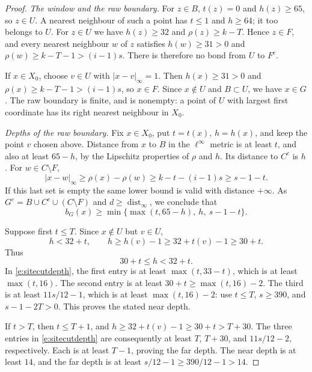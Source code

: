 \begin{proof}
\emph{The window and the raw boundary.}
For \(z\in B\), \(t(z)=0\) and \(h(z)\ge65\), so \(z\in U\).
A nearest neighbour of such a point has \(t\le1\) and
\(h\ge64\); it too belongs to \(U\).  For \(z\in U\) we
have \(h(z)\ge32\) and \(\rho(z)\ge k-T\).  Hence \(z\in F\),
and every nearest neighbour \(w\) of \(z\) satisfies
\(h(w)\ge31>0\) and \(\rho(w)\ge k-T-1>(i-1)s\).
There is therefore no bond from \(U\) to \(F^c\).

If \(x\in X_0\), choose \(v\in U\) with
\(|x-v|_\infty=1\).  Then
\(h(x)\ge31>0\) and \(\rho(x)\ge k-T-1>(i-1)s\),
so \(x\in F\).  Since \(x\notin U\) and \(B\subset U\),
we have \(x\in G\).  The raw boundary is finite, and is
nonempty: a point of \(U\) with largest first coordinate has
its right nearest neighbour in \(X_0\).

\emph{Depths of the raw boundary.}
Fix \(x\in X_0\), put \(t=t(x)\), \(h=h(x)\), and keep the
point \(v\) chosen above.  Distance from \(x\) to \(B\) in
the \(\ell^\infty\) metric is at least \(t\), and also at
least \(65-h\), by the Lipschitz properties of \(\rho\) and
\(h\).  Its distance to \(C^c\) is \(h\).  For
\(w\in C\setminus F\),
\[
 |x-w|_\infty\ge\rho(x)-\rho(w)
       \ge k-t-(i-1)s\ge s-1-t.
\]
If this last set is empty the same lower bound is valid with
distance \(+\infty\).  As \(G^c=B\cup C^c\cup(C\setminus F)\)
and \(d\ge\operatorname{dist}_\infty\), we conclude that
\begin{equation}\label{e:sitecutdepth}
 b_G(x)\ge
    \min\{\max(t,65-h),\ h,\ s-1-t\}.
\end{equation}

Suppose first \(t\le T\).  Since \(x\notin U\) but \(v\in U\),
\[
 h<32+t,\qquad
 h\ge h(v)-1\ge32+t(v)-1\ge30+t.
\]
Thus
\begin{equation}\label{e:rawdepthrange}
                30+t\le h<32+t.
\end{equation}
In \eqref{e:sitecutdepth}, the first entry is at least
\(\max(t,33-t)\), which is at least \(\max(t,16)\).
The second entry is at least \(30+t\ge\max(t,16)-2\).
The third is at least \(11s/12-1\), which is at least
\(\max(t,16)-2\): use \(t\le T\), \(s\ge390\), and
\(s-1-2T>0\).  This proves the stated near depth.

If \(t>T\), then \(t\le T+1\), and
\(h\ge32+t(v)-1\ge30+t>T+30\).
The three entries in \eqref{e:sitecutdepth} are consequently
at least \(T\), \(T+30\), and \(11s/12-2\), respectively.
Each is at least \(T-1\), proving the far depth.
The near depth is at least \(14\), and the far depth is
at least \(s/12-1\ge390/12-1>14\).


\end{proof}
